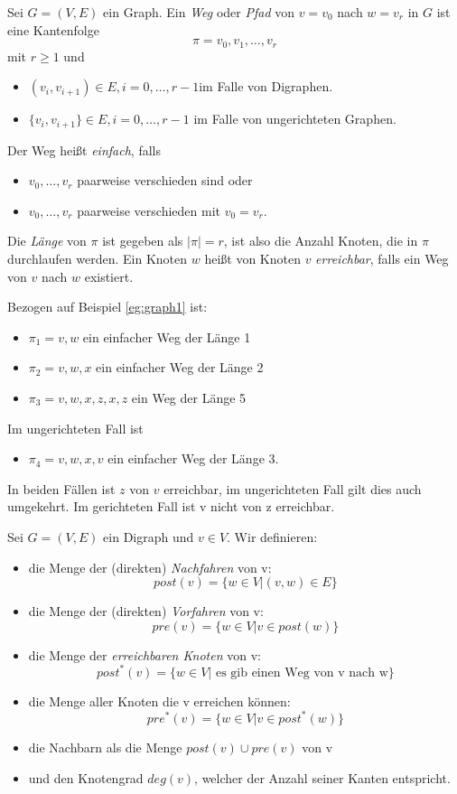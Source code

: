 \begin{definition}
Sei $G=(V,E)$ ein Graph. Ein \emph{Weg} oder \emph{Pfad} von $v=v_0$ nach $w=v_r$ in $G$ ist eine Kantenfolge
\[
\pi=v_0,v_1,\ldots,v_r
\]
mit $r\ge1$ und
\begin{itemize}
	\item $(v_i, v_{i+1}) \in  E, i=0,\ldots,r-1$im Falle von Digraphen.
	\item $\{v_i,v_{i+1}\}\in E, i=0,\ldots,r-1$ im Falle von ungerichteten Graphen.
\end{itemize}
Der Weg heißt \emph{einfach}, falls
\begin{itemize}
	\item $v_0,\ldots,v_r$ paarweise verschieden sind oder
	\item $v_0,\ldots,v_r$  paarweise verschieden mit $v_0=v_r$.
\end{itemize}
Die \emph{Länge} von $\pi$ ist gegeben als $|\pi|=r$, ist also die Anzahl Knoten, die in $\pi$ durchlaufen werden.
Ein Knoten $w$ heißt von Knoten $v$ \emph{erreichbar}, falls ein Weg von $v$ nach $w$ existiert.
\end{definition}
\begin{example}
Bezogen auf Beispiel \ref{eg:graph1} ist:
\begin{itemize}
	\item $\pi_1= v,w$ ein einfacher Weg der Länge 1
	\item $\pi_2 =v,w,x$ ein einfacher Weg der Länge 2
	\item $\pi_3=v,w,x,z,x,z$ ein Weg der Länge 5
\end{itemize}
Im ungerichteten Fall ist 
\begin{itemize}
	\item $\pi_4=v,w,x,v$ ein einfacher Weg der Länge 3.
\end{itemize}
In beiden Fällen ist $z$ von $v$ erreichbar, im ungerichteten Fall gilt dies auch umgekehrt. Im gerichteten Fall ist v nicht von z erreichbar.
\end{example}
\begin{definition}
	\label{def:extendedgraph}
Sei $G=(V,E)$ ein Digraph und $v \in V$. Wir definieren:
\begin{itemize}
	\item die Menge der (direkten) \emph{Nachfahren} von v:
		\[
	post(v)=\{w \in V | (v,w) \in E\} 
		\]
	\item die Menge der (direkten) \emph{Vorfahren} von v:
		\[
		pre(v) = \{w \in  V | v \in  post(w)\} 
		\]
	\item die Menge der \emph{erreichbaren Knoten} von v:
		\[
		post^*(v)=\{w \in V | \text{ es gib einen Weg von v nach w}\} 
		\]
	\item die Menge aller Knoten die v erreichen können:
		\[
		pre^*(v)= \{w \in  V | v \in  post^*(w) \} 
		\]
	\item die Nachbarn als die Menge $post(v) \cup pre(v)$ von v
	\item und den Knotengrad $deg(v)$, welcher der Anzahl seiner Kanten entspricht.
\end{itemize}
\end{definition}
